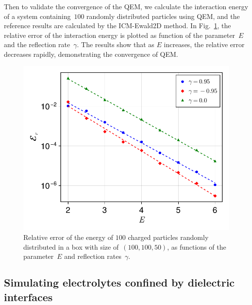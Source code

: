 Then to validate the convergence of the QEM, we calculate the interaction energy of a system containing~$100$ randomly distributed particles using QEM, and the reference results are calculated by the ICM-Ewald2D method.
In Fig.~\ref{fig:Error_E}, the relative error of the interaction energy is plotted as function of the parameter~$E$ and the reflection rate~$\gamma$.
The results show that as $E$ increases, the relative error decreases rapidly, demonstrating the convergence of QEM.

\begin{figure}[htb]
    \centering
    \includegraphics[width = 0.625\linewidth]{figs/e_total.pdf}
    \caption{
        Relative error of the energy of $100$ charged particles randomly distributed in a box with size of~$(100, 100, 50)$, as functions of the parameter~$E$ and reflection rates~$\gamma$.
    }
    \label{fig:Error_E}
\end{figure}


\subsection{Simulating electrolytes confined by dielectric interfaces}

